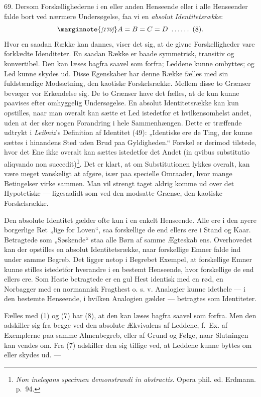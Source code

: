 \documentclass[12pt,a4paper]{book}
\newcommand{\opage}[1]{\marginnote{\footnotesize\textit{[#1]}}}
\newcommand{\apage}[1]{\marginnote{\footnotesize\textit{[#1]}}}
\begin{document}
69. Dersom Forskellighederne i en eller anden Henseende eller i alle
Henseender falde bort ved nærmere Undersøgelse, faa vi en \emph{absolut
Identitetsrække}:
\[
\opage{170}A = B = C = D \ \ldots\ldots\ (8). \]
Hvor en saadan Række kan dannes, viser det sig, at de givne Forskelligheder
vare forklædte Idenditeter. En saadan Række er baade symmetrisk, transitiv og
konvertibel. Den kan læses bagfra saavel som forfra; Leddene kunne ombyttes; og
Led kunne skydes ud. Disse Egenskaber har denne Række fælles med sin
fuldstændige Modsætning, den kaotiske Forskelsrække. Mellem disse to Grænser
bevæger vor Erkendelse sig. De to Grænser have det fælles, at de kun kunne
paavises efter omhyggelig Undersøgelse. En absolut Identitetsrække kan kun
opstilles, naar man overalt kan sætte et Led istedetfor et hvilkensomhelst
andet, uden at der sker nogen Forandring i hele Sammenhængen. Dette er
træffende udtrykt i \emph{Leibniz}'s Definition af Identitet (49): „Identiske
ere de Ting, der kunne sættes i hinandens Sted uden Brud paa Gyldigheden.“
Forskel er derimod tilstede, hvor det Ene ikke overalt kan sættes istedetfor
det Andet (in qvibus substitutio aliqvando non succedit)\footnote{\emph{Non inelegans specimen demonstrandi in abstractis}. Opera phil. ed. Erdmann. p.~94.}. Det er klart,
at om Substitutionen lykkes overalt, kan være meget vanskeligt at afgøre, især
paa specielle Omraader, hvor mange Betingelser virke sammen. Man vil strengt
taget aldrig komme ud over det Hypotetiske --- ligesaalidt som ved den modsatte
Grænse, den kaotiske Forskelsrække.

Den absolute Identitet gælder ofte kun i en enkelt Henseende. Alle ere i den
nyere borgerlige Ret „lige for Loven“, saa forskellige de end ellers ere i
Stand og Kaar. Betragtede som „Søskende“ staa alle Børn af samme Ægteskab ens.
Overhovedet kan der opstilles en absolut Identitetsrække, naar forskellige
Emner falde ind under samme Begreb. Det ligger netop i Begrebet Exempel, at
forskellige Emner kunne stilles istedetfor hverandre i en bestemt Henseende,
hvor forskellige de end ellers ere. Som Heste betragtede er en gul Hest
identisk med en rød, en Norbagger med en normannisk Fragthest o. s. v.
Analogier kunne idethele --- i den bestemte Henseende, i hvilken Analogien
gælder --- betragtes som Identiteter.

\apage{171} Fælles med (1) og (7) har (8), at den kan læses bagfra saavel som
forfra. Men den adskiller sig fra begge ved den absolute Ækvivalens af
Leddene, f.\ Ex. af Exemplerne paa samme Almenbegreb, eller af Grund og
Følge, naar Slutningen kan vendes om. Fra (7) adskiller den sig tillige
ved, at Leddene kunne byttes om eller skydes ud. ---
\end{document}
